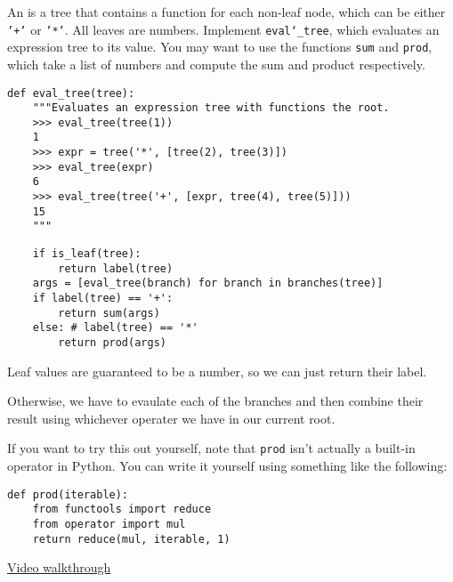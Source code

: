 \question An  is a tree that contains a function for
each non-leaf node, which can be either \texttt{'+'} or \texttt{'*'}. All leaves
are numbers. Implement \texttt{eval\char`_tree}, which evaluates an expression tree
to its value. You may want to use the functions \texttt{sum} and
\texttt{prod}, which take a list of numbers and compute the sum and product
respectively.

\begin{lstlisting}
def eval_tree(tree):
    """Evaluates an expression tree with functions the root.
    >>> eval_tree(tree(1))
    1
    >>> expr = tree('*', [tree(2), tree(3)])
    >>> eval_tree(expr)
    6
    >>> eval_tree(tree('+', [expr, tree(4), tree(5)]))
    15
    """
\end{lstlisting}
\begin{solution}[1.2in]
\begin{lstlisting}
    if is_leaf(tree):
        return label(tree)
    args = [eval_tree(branch) for branch in branches(tree)]
    if label(tree) == '+':
        return sum(args)
    else: # label(tree) == '*'
        return prod(args)
\end{lstlisting}
Leaf values are guaranteed to be a number, so we can just return their label.

Otherwise, we have to evaulate each of the branches and then combine their
result using whichever operater we have in our current root.

If you want to try this out yourself, note that \texttt{prod} isn't actually a
built-in operator in Python. You can write it yourself using something like the
following:
\begin{lstlisting}
def prod(iterable):
    from functools import reduce
    from operator import mul
    return reduce(mul, iterable, 1)
\end{lstlisting}
\href{https://www.youtube.com/watch?v=Am6m8YgAnYY&list=PLx38hZJ5RLZdJgRCgpaTbmRXKAHOUmomO&index=4&t=12m40s}{Video walkthrough}
\end{solution}
